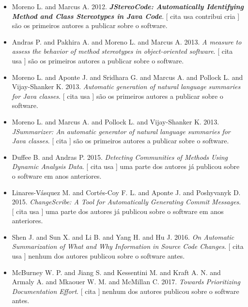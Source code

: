 \begin{itemize}
\item Moreno L. and Marcus A.
      2012.
        \textbf{\textit{ JStereoCode: Automatically Identifying Method and Class Stereotypes in Java Code}}.
      [
          cita
          usa
          contribui
          cria
      ]
são os primeiros autores a publicar sobre o software.
\item Andras P. and Pakhira A. and Moreno L. and Marcus A.
      2013.
        \textit{ A measure to assess the behavior of method stereotypes in object-oriented software}.
      [
          cita
          usa
      ]
são os primeiros autores a publicar sobre o software.
\item Moreno L. and Aponte J. and Sridhara G. and Marcus A. and Pollock L. and Vijay-Shanker K.
      2013.
        \textit{ Automatic generation of natural language summaries for Java classes}.
      [
          cita
          usa
      ]
são os primeiros autores a publicar sobre o software.
\item Moreno L. and Marcus A. and Pollock L. and Vijay-Shanker K.
      2013.
        \textit{ JSummarizer: An automatic generator of natural language summaries for Java classes}.
      [
          cita
      ]
são os primeiros autores a publicar sobre o software.
\item Duffee B. and Andras P.
      2015.
        \textit{ Detecting Communities of Methods Using Dynamic Analysis Data}.
      [
          cita
          usa
      ]
uma parte dos autores já publicou sobre o software em anos anteriores.
\item Linares-Vásquez M. and Cortés-Coy F. L. and Aponte J. and Poshyvanyk D.
      2015.
        \textit{ ChangeScribe: A Tool for Automatically Generating Commit Messages}.
      [
          cita
          usa
      ]
uma parte dos autores já publicou sobre o software em anos anteriores.
\item Shen J. and Sun X. and Li B. and Yang H. and Hu J.
      2016.
        \textit{ On Automatic Summarization of What and Why Information in Source Code Changes}.
      [
          cita
          usa
      ]
nenhum dos autores publicou sobre o software antes.
\item McBurney W. P. and Jiang S. and Kessentini M. and Kraft A. N. and Armaly A. and Mkaouer W. M. and McMillan C.
      2017.
        \textit{ Towards Prioritizing Documentation Effort}.
      [
          cita
      ]
nenhum dos autores publicou sobre o software antes.
\end{itemize}
